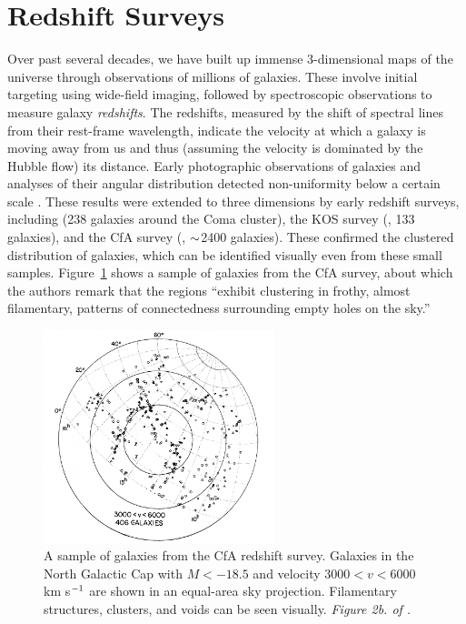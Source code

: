 \section{Redshift Surveys}

Over past several decades, we have built up immense 3-dimensional maps of the universe through observations of millions of galaxies.
These involve initial targeting using wide-field imaging, followed by spectroscopic observations to measure galaxy \emph{redshifts}.
The redshifts, measured by the shift of spectral lines from their rest-frame wavelength, indicate the velocity at which a galaxy is moving away from us and thus (assuming the velocity is dominated by the Hubble flow) its distance.
Early photographic observations of galaxies and  analyses of their angular distribution detected non-uniformity below a certain scale \citep{shapley_survey_1932,hubble_distribution_1934,seldner_new_1977,PeeblesHauser1974,peebles_galaxy_2001}.
These results were extended to three dimensions by early redshift surveys, including \cite{gregory_comaa1367_1978} (238 galaxies around the Coma cluster), the KOS survey (\citealt{kirshner_million_1981}, 133 galaxies), and the CfA survey (\citealt{davis_survey_1982}, $\mathord{\sim}$2400 galaxies).
These confirmed the clustered distribution of galaxies, which can be identified visually even from these small samples. 
Figure~\ref{fig:cfa_survey} shows a sample of galaxies from the CfA survey, about which the authors remark that the regions ``exhibit clustering in frothy, almost filamentary, patterns of connectedness surrounding empty holes on the sky.''

\begin{figure}
    \centering
    \includegraphics[width=0.6\textwidth]{cfa_survey}
    \caption{A sample of galaxies from the CfA redshift survey. Galaxies in the North Galactic Cap with $M<-18.5$ and velocity $3000<v<6000$ km s$^{-1}$ are shown in an equal-area sky projection. Filamentary structures, clusters, and voids can be seen visually. \emph{Figure 2b. of \cite{davis_survey_1982}.}}
    \label{fig:cfa_survey}
\end{figure}

